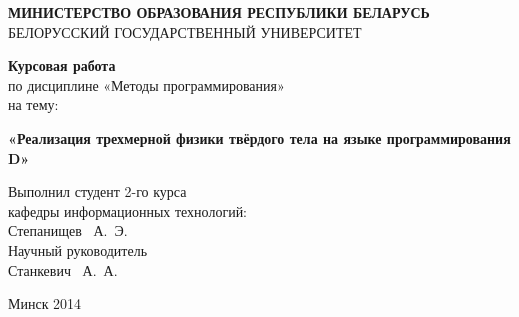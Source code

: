 \begin{titlepage}
\newpage

\begin{center}
\textbf{МИНИСТЕРСТВО ОБРАЗОВАНИЯ РЕСПУБЛИКИ БЕЛАРУСЬ} \\
\vspace{1cm}
БЕЛОРУССКИЙ ГОСУДАРСТВЕННЫЙ УНИВЕРСИТЕТ \\
\end{center}
 
\vspace{8em}

\begin{center}
\Large \textbf{Курсовая работа} \\
по дисциплине  «Методы программирования» \\
на тему:
\end{center}

\vspace{2.5em}
 
\begin{center}
\textbf{«Реализация трехмерной физики твёрдого тела \linebreak на языке программирования D»}
\end{center}

\vspace{12em}
 
\begin{flushleft}
Выполнил студент 2-го курса \\
кафедры информационных технологий: \\
Степанищев ~А.~Э. \\
\vspace{1.5em}
Научный руководитель \\
Станкевич ~А.~А.\\
\vspace{1.5em}
\end{flushleft}
 
\vspace{\fill}

\begin{center}
Минск 2014
\end{center}

\end{titlepage} 
